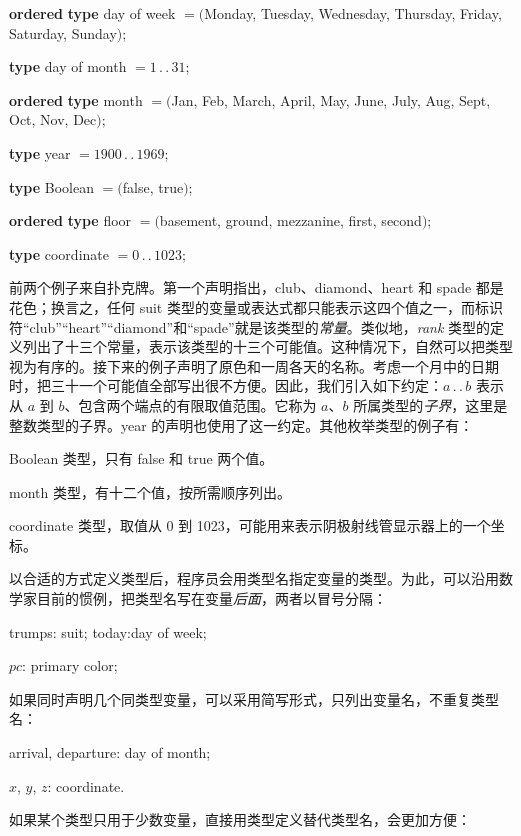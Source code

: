 \documentclass[twoside,11pt,fontset=none]{ctexbook}
\begin{document}
\noindent
{}\parindent\textbf{ordered} \tabto{3.7em}\textbf{type} day of week $= ($Monday, Tuesday, Wednesday, Thursday, Friday, Saturday, Sunday$)$;
\medskip

\tabto{3.7em}\textbf{type} day of month $= 1\,.\,.\,31$;

\noindent
{}\parindent\textbf{ordered} \tabto{3.7em}\textbf{type} month $= ($Jan, Feb, March, April, May, June, July, Aug, Sept, Oct, Nov, Dec$)$;
\medskip

\tabto{3.7em}\textbf{type} year $= 1900\,.\,.\,1969$;

\tabto{3.7em}\textbf{type} Boolean $= ($false, true$)$;
\medskip

\noindent
{}\parindent\textbf{ordered} \tabto{3.7em}\textbf{type} floor $= ($basement, ground, mezzanine, first, second$)$;

\tabto{3.7em}\textbf{type} coordinate $= 0\,.\,.\,1023$;
\medskip

前两个例子来自扑克牌。第一个声明指出，club、diamond、heart 和 spade 都是花色；换言之，任何 suit 类型的变量或表达式都只能表示这四个值之一，而标识符“club”“heart”“diamond”和“spade”就是该类型的\textit{常量}。类似地，\textit{rank} 类型的定义列出了十三个常量，表示该类型的十三个可能值。这种情况下，自然可以把类型视为有序的。接下来的例子声明了原色和一周各天的名称。考虑一个月中的日期时，把三十一个可能值全部写出很不方便。因此，我们引入如下约定：$a\,.\,.\,b$ 表示从 $a$ 到 $b$、包含两个端点的有限取值范围。它称为 $a$、$b$ 所属类型的\textit{子界}，这里是整数类型的子界。year 的声明也使用了这一约定。其他枚举类型的例子有：

\quad Boolean 类型，只有 false 和 true 两个值。

\quad month 类型，有十二个值，按所需顺序列出。

\parindent\quad coordinate 类型，取值从 0 到 1023，可能用来表示阴极射线管显示器上的一个坐标。

以合适的方式定义类型后，程序员会用类型名指定变量的类型。为此，可以沿用数学家目前的惯例，把类型名写在变量\textit{后面}，两者以冒号分隔：

\quad trumps: suit; today:day of week;

\quad $pc$: primary color;

\noindent
如果同时声明几个同类型变量，可以采用简写形式，只列出变量名，不重复类型名：

\quad arrival, departure: day of month;

\quad $x$, $y$, $z$: coordinate.

\noindent
如果某个类型只用于少数变量，直接用类型定义替代类型名，会更加方便：
\end{document}
